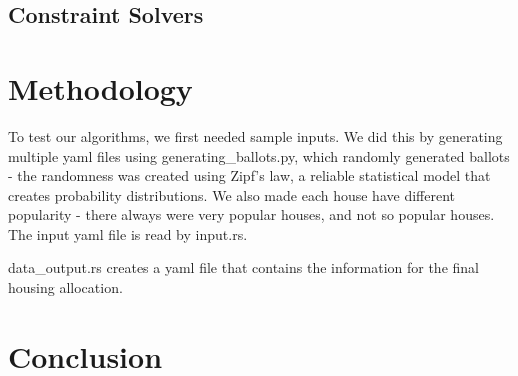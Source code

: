 \documentclass[11pt]{article}
\begin{document}
\subsection{Constraint Solvers}
\label{sec:org640dd4f}

\section{Methodology}
\label{sec:orgc0ba115}
To test our algorithms, we first needed sample inputs. We did this by generating multiple yaml files using generating_ballots.py, which randomly generated ballots - the randomness was created using Zipf’s law, a reliable statistical model that creates probability distributions. We also made each house have different popularity - there always were very popular houses, and not so popular houses. 
The input yaml file is read by input.rs. 

data_output.rs creates a yaml file that contains the information for the final housing allocation.


\section{Conclusion}
\label{sec:orgb6da137}
\end{document}
